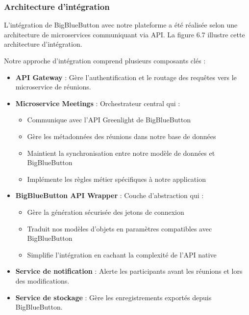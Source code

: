 \subsubsection{Architecture d'intégration}
L'intégration de BigBlueButton avec notre plateforme a été réalisée selon une architecture de microservices communiquant via API. La figure 6.7 illustre cette architecture d'intégration.


Notre approche d'intégration comprend plusieurs composants clés :

\begin{itemize}
    \item \textbf{API Gateway} : Gère l'authentification et le routage des requêtes vers le microservice de réunions.
    
    \item \textbf{Microservice Meetings} : Orchestrateur central qui :
    \begin{itemize}
        \item Communique avec l'API Greenlight de BigBlueButton
        \item Gère les métadonnées des réunions dans notre base de données
        \item Maintient la synchronisation entre notre modèle de données et BigBlueButton
        \item Implémente les règles métier spécifiques à notre application
    \end{itemize}
    
    \item \textbf{BigBlueButton API Wrapper} : Couche d'abstraction qui :
    \begin{itemize}
        \item Gère la génération sécurisée des jetons de connexion
        \item Traduit nos modèles d'objets en paramètres compatibles avec BigBlueButton
        \item Simplifie l'intégration en cachant la complexité de l'API native
    \end{itemize}
    
    \item \textbf{Service de notification} : Alerte les participants avant les réunions et lors des modifications.
    
    \item \textbf{Service de stockage} : Gère les enregistrements exportés depuis BigBlueButton.
\end{itemize}

